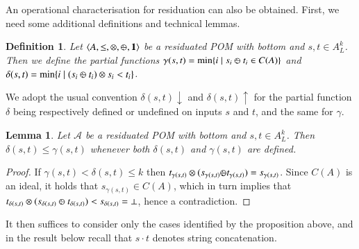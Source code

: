 \documentclass[a4paper]{elsarticle}
\newtheorem{definition}{Definition}
\newtheorem{lemma}{Lemma}
\newcommand{\monop}{\otimes}
\newcommand{\1}{\mathbf{1}}
\def\odiv{{ \ominus\hspace{-8pt}:}\;}
\begin{document}
An operational characterisation for residuation can also be obtained. 
First, we need some additional definitions and technical lemmas.

\begin{definition}
	Let $\langle A, \leq, \monop, \odiv, \1 \rangle$
	be a residuated POM with bottom and $s, t \in A^k_L$. Then 
	we define the partial functions 
	$\gamma(s, t) = \min\{ i \mid s_i \mathbin{\odiv} t_i \in C(A)\}$
	and $\delta(s, t) = \min\{ i \mid (s_i \mathbin{\odiv} t_i) \otimes s_i < t_i\}$.
\end{definition}

We adopt the usual convention $\delta(s,t){\downarrow}$ and $\delta(s,t){\uparrow}$ for 
the partial function $\delta$ being respectively defined or undefined on inputs $s$ and $t$,
and the same for $\gamma$.


\begin{lemma}\label{limit}
	Let $\mathcal{A}$ be a residuated POM with bottom
	and $s, t \in A^k_L$. Then 
	$\delta(s,t) \leq \gamma(s,t)$
	whenever both 	$\delta(s,t)$ and $\gamma(s,t)$
	are defined.
\end{lemma}
\begin{proof}
	If $\gamma(s,t) < \delta(s,t) \leq k$ then 
	$t_{\gamma(s,t)} \otimes (s_{\gamma(s,t)} \odiv t_{\gamma(s,t)})  = s_{\gamma(s,t)}$.
	Since $C(A)$ is an ideal, it holds that $s_{\gamma(s,t)} \in C(A)$, 
	which in turn implies that $t_{\delta(s,t)} \otimes (s_{\delta(s,t)} \mathbin{\odiv} t_{\delta(s,t)}) < s_{\delta(s,t)} = \bot$,
	hence a contradiction. 
\end{proof}

It then suffices to consider only the cases identified by the proposition above, and
in the result below recall that $s \cdot t$ denotes string concatenation.
\end{document}
